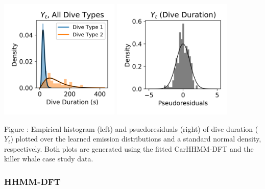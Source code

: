 \documentclass{article}
\begin{document}
        \begin{center}
        \includegraphics[width=2.25in]{../Plots/CarHHMM2_empirical_hist_dive_duration.png}
        \includegraphics[width=2.25in]{../Plots/CarHHMM2_psedoresids_Dive_Duration.png}
        \end{center}
        
        \noindent Figure : Empirical histogram (left) and psuedoresiduals (right) of dive duration ($Y_{t}$) plotted over the learned emission distributions and a standard normal density, respectively. Both plots are generated using the fitted CarHHMM-DFT and the killer whale case study data.
        \addtocounter{fignum}{1}
        
        \subsubsection{HHMM-DFT}
        
\end{document}

